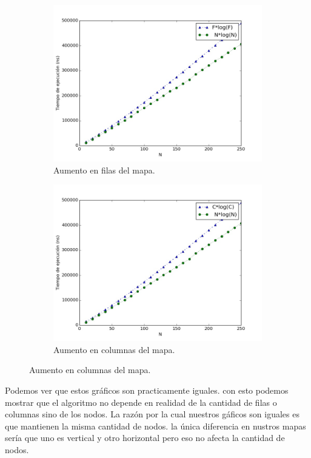 \documentclass[spanish,12pt]{article}
\begin{document}
\clearpage
\begin{figure}[!ht]
    \centering
    \begin{subfigure}{0.45\textwidth}
        \includegraphics[width=\textwidth]{soloFilas}
        \caption{Aumento en filas del mapa.}
        \label{}
    \end{subfigure}
    \begin{subfigure}{0.45\textwidth}
        \includegraphics[width=\textwidth]{soloColumnas}
        \caption{Aumento en columnas del mapa.}
        \label{}
    \end{subfigure}
\end{figure}

Podemos ver que estos gráficos son practicamente iguales. con esto podemos mostrar que el algoritmo no depende en realidad de la cantidad de filas o columnas sino de los nodos. La razón por la cual nuestros gáficos son iguales es que mantienen la misma cantidad de nodos. la única diferencia en nustros mapas sería que uno es vertical y otro horizontal pero eso no afecta la cantidad de nodos.
\end{document}
